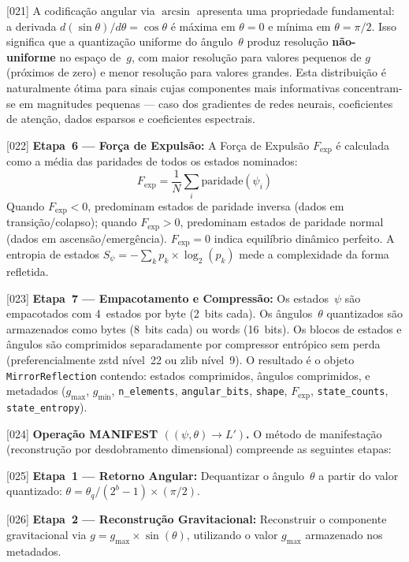 \documentclass[12pt,a4paper]{article}
\newcommand{\Fexp}{F_{\text{exp}}}
\begin{document}
{[021]} A codificação angular via $\arcsin$ apresenta uma
propriedade fundamental: a derivada
$d(\sin\theta)/d\theta = \cos\theta$ é máxima em $\theta = 0$
e mínima em $\theta = \pi/2$. Isso significa que a quantização
uniforme do ângulo~$\theta$ produz resolução \textbf{não-uniforme}
no espaço de~$g$, com maior resolução para valores pequenos de
$g$ (próximos de zero) e menor resolução para valores grandes.
Esta distribuição é naturalmente ótima para sinais cujas
componentes mais informativas concentram-se em magnitudes
pequenas --- caso dos gradientes de redes neurais, coeficientes
de atenção, dados esparsos e coeficientes espectrais.

{[022]} \textbf{Etapa~6 --- Força de Expulsão:} A Força de
Expulsão $\Fexp$ é calculada como a média das paridades de
todos os estados nominados:
\begin{equation}
\Fexp = \frac{1}{N} \sum_i \text{paridade}(\psi_i)
\label{eq:fexp}
\end{equation}
Quando $\Fexp < 0$, predominam estados de paridade inversa
(dados em transição/colapso); quando $\Fexp > 0$, predominam
estados de paridade normal (dados em ascensão/emergência).
$\Fexp = 0$ indica equilíbrio dinâmico perfeito. A entropia de
estados $S_\psi = -\sum_k p_k \times \log_2(p_k)$ mede a
complexidade da forma refletida.

{[023]} \textbf{Etapa~7 --- Empacotamento e Compressão:} Os
estados~$\psi$ são empacotados com 4~estados por byte (2~bits
cada). Os ângulos~$\theta$ quantizados são armazenados como
bytes (8~bits cada) ou words (16~bits). Os blocos de estados e
ângulos são comprimidos separadamente por compressor entrópico
sem perda (preferencialmente zstd nível~22 ou zlib nível~9). O
resultado é o objeto \texttt{MirrorReflection} contendo:
estados comprimidos, ângulos comprimidos, e metadados
($g_{\max}$, $g_{\min}$, \texttt{n\_elements},
\texttt{angular\_bits}, \texttt{shape}, $\Fexp$,
\texttt{state\_counts}, \texttt{state\_entropy}).

{[024]} \textbf{Operação MANIFEST
$((\psi, \theta) \to L')$.} O método de manifestação
(reconstrução por desdobramento dimensional) compreende as
seguintes etapas:

{[025]} \textbf{Etapa~1 --- Retorno Angular:} Dequantizar o
ângulo~$\theta$ a partir do valor quantizado:
$\theta = \theta_q / (2^b - 1) \times (\pi/2)$.

{[026]} \textbf{Etapa~2 --- Reconstrução Gravitacional:}
Reconstruir o componente gravitacional via
$g = g_{\max} \times \sin(\theta)$, utilizando o valor
$g_{\max}$ armazenado nos metadados.
\end{document}
